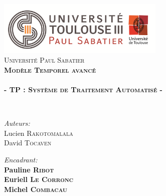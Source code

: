 
\begin{titlepage}
\begin{center}


\includegraphics[width=0.60\textwidth]{./page_de_garde/logo_ups.png}~\\[1cm]

\textsc{\LARGE Université Paul Sabatier}\\[1.5cm]

\textsc{\Large \bf Modèle Temporel avancé }\\[0.5cm]

\HRule \\[0.4cm]

{\huge \bfseries  - TP : \textsc{Système de Traitement Automatisé} -}

\HRule \\[1.5cm]

\begin{minipage}{0.4\textwidth}
\begin{flushleft} \large
\emph{Auteurs:}\\
Lucien \textsc{Rakotomalala}\\
David \textsc{Tocaven}\\
\end{flushleft}
\end{minipage}
\begin{minipage}{0.58\textwidth}
\begin{flushright} \large
\emph{Encadrant:} \\
\textbf{ Pauline \textsc{Ribot}}\\
\textbf{ Euriell \textsc{Le Corronc}}\\
\textbf{ Michel \textsc{Combacau}}
\end{flushright}
\end{minipage}
\newline
\newline
\vfill
~\\[1cm]


\end{center}
\end{titlepage}
